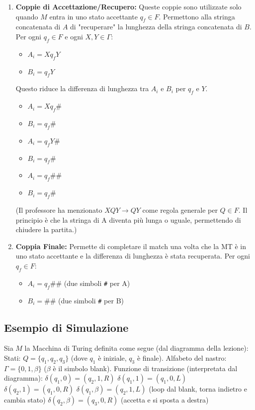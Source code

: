 \documentclass[a4paper, 11pt]{book} %
\theoremstyle{definition}
\begin{document}
\begin{enumerate}
    \item \textbf{Coppie di Accettazione/Recupero:}
    Queste coppie sono utilizzate solo quando $M$ entra in uno stato accettante $q_f \in F$. Permettono alla stringa concatenata di $A$ di "recuperare" la lunghezza della stringa concatenata di $B$.
    Per ogni $q_f \in F$ e ogni $X, Y \in \Gamma$:
    \begin{itemize}
        \item $A_i = Xq_f Y$
        \item $B_i = q_f Y$
    \end{itemize}
    Questo riduce la differenza di lunghezza tra $A_i$ e $B_i$ per $q_f$ e $Y$.
    \begin{itemize}
        \item $A_i = Xq_f \#$
        \item $B_i = q_f \#$
    \end{itemize}
    \begin{itemize}
        \item $A_i = q_f Y \#$
        \item $B_i = q_f \#$
    \end{itemize}
    \begin{itemize}
        \item $A_i = q_f \# \#$
        \item $B_i = q_f \#$
    \end{itemize}
    (Il professore ha menzionato $XQY \to QY$ come regola generale per $Q \in F$. Il principio è che la stringa di A diventa più lunga o uguale, permettendo di chiudere la partita.)

    \item \textbf{Coppia Finale:}
    Permette di completare il match una volta che la MT è in uno stato accettante e la differenza di lunghezza è stata recuperata.
    Per ogni $q_f \in F$:
    \begin{itemize}
        \item $A_i = q_f \# \#$ (due simboli \texttt{\#} per A)
        \item $B_i = \# \#$ (due simboli \texttt{\#} per B)
    \end{itemize}
\end{enumerate}

\subsection{Esempio di Simulazione}
Sia $M$ la Macchina di Turing definita come segue (dal diagramma della lezione):
Stati: $Q = \{q_1, q_2, q_3\}$ (dove $q_1$ è iniziale, $q_3$ è finale).
Alfabeto del nastro: $\Gamma = \{0, 1, \beta\}$ ($\beta$ è il simbolo blank).
Funzione di transizione (interpretata dal diagramma):
$\delta(q_1, 0) = (q_2, 1, R)$
$\delta(q_1, 1) = (q_1, 0, L)$
$\delta(q_2, 1) = (q_1, 0, R)$
$\delta(q_1, \beta) = (q_2, 1, L)$ (loop dal blank, torna indietro e cambia stato)
$\delta(q_2, \beta) = (q_3, 0, R)$ (accetta e si sposta a destra)
\end{document}
